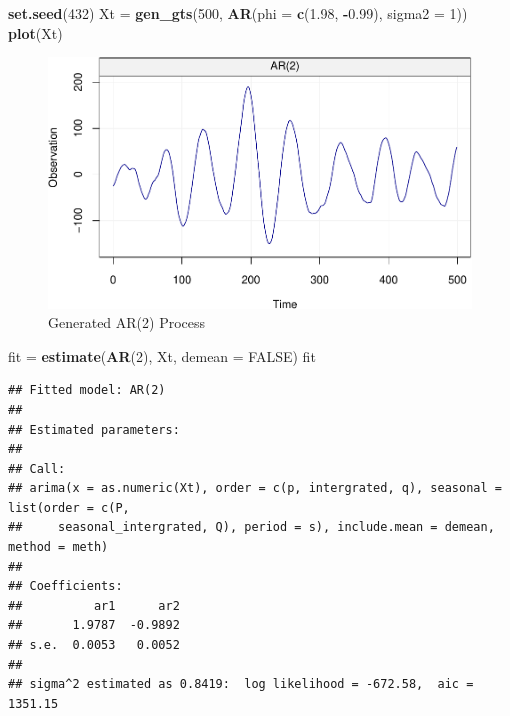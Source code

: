\documentclass[]{book}
\newenvironment{Shaded}{\begin{snugshade}}{\end{snugshade}}
\newcommand{\KeywordTok}[1]{\textcolor[rgb]{0.13,0.29,0.53}{\textbf{#1}}}
\newcommand{\DataTypeTok}[1]{\textcolor[rgb]{0.13,0.29,0.53}{#1}}
\newcommand{\DecValTok}[1]{\textcolor[rgb]{0.00,0.00,0.81}{#1}}
\newcommand{\FloatTok}[1]{\textcolor[rgb]{0.00,0.00,0.81}{#1}}
\newcommand{\StringTok}[1]{\textcolor[rgb]{0.31,0.60,0.02}{#1}}
\newcommand{\OtherTok}[1]{\textcolor[rgb]{0.56,0.35,0.01}{#1}}
\newcommand{\OperatorTok}[1]{\textcolor[rgb]{0.81,0.36,0.00}{\textbf{#1}}}
\newcommand{\NormalTok}[1]{#1}
\theoremstyle{definition}
\theoremstyle{definition}
\theoremstyle{definition}
\theoremstyle{remark}
\begin{document}
\begin{Shaded}
\begin{Highlighting}[]
\KeywordTok{set.seed}\NormalTok{(}\DecValTok{432}\NormalTok{)}
\NormalTok{Xt =}\StringTok{ }\KeywordTok{gen_gts}\NormalTok{(}\DecValTok{500}\NormalTok{, }\KeywordTok{AR}\NormalTok{(}\DataTypeTok{phi =} \KeywordTok{c}\NormalTok{(}\FloatTok{1.98}\NormalTok{, }\OperatorTok{-}\FloatTok{0.99}\NormalTok{), }\DataTypeTok{sigma2 =} \DecValTok{1}\NormalTok{))}
\KeywordTok{plot}\NormalTok{(Xt)}
\end{Highlighting}
\end{Shaded}

\begin{figure}

{\centering \includegraphics{ts_files/figure-latex/CIAR2data-1} 

}

\caption{Generated AR(2) Process}\label{fig:CIAR2data}
\end{figure}

\begin{Shaded}
\begin{Highlighting}[]
\NormalTok{fit =}\StringTok{ }\KeywordTok{estimate}\NormalTok{(}\KeywordTok{AR}\NormalTok{(}\DecValTok{2}\NormalTok{), Xt, }\DataTypeTok{demean =} \OtherTok{FALSE}\NormalTok{)}
\NormalTok{fit}
\end{Highlighting}
\end{Shaded}

\begin{verbatim}
## Fitted model: AR(2)
## 
## Estimated parameters:
## 
## Call:
## arima(x = as.numeric(Xt), order = c(p, intergrated, q), seasonal = list(order = c(P, 
##     seasonal_intergrated, Q), period = s), include.mean = demean, method = meth)
## 
## Coefficients:
##          ar1      ar2
##       1.9787  -0.9892
## s.e.  0.0053   0.0052
## 
## sigma^2 estimated as 0.8419:  log likelihood = -672.58,  aic = 1351.15
\end{verbatim}
\end{document}
